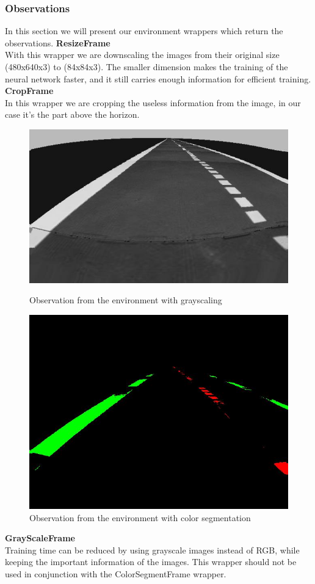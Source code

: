 \documentclass{article}
\begin{document}
\subsubsection{\normalsize{Observations}}
In this section we will present our environment wrappers which return the observations.
\textbullet  \textbf{ResizeFrame}\\
With this wrapper we are downscaling the images from their original size (480x640x3) \cite{kalap} to (84x84x3). The smaller dimension makes the training of the neural network faster, and it still carries enough information for efficient training.\\
\textbullet  \textbf{CropFrame}\\
In this wrapper we are cropping the useless information from the image, in our case it's the part above the horizon.\\
\begin{figure}[h!]
	\centering
	\begin{minipage}{.5\textwidth}
	\centering
	\includegraphics[width=0.8\linewidth]{grayscale.jpg}
	\caption{Observation from the environment with grayscaling}
	\end{minipage}%
\begin{minipage}{.5\textwidth}
	\centering
	\includegraphics[width=0.8\linewidth]{colorseg.jpg}
	\caption{Observation from the environment with color segmentation}
\end{minipage}
\end{figure}
\textbullet  \textbf{GrayScaleFrame}\\
Training time can be reduced by using grayscale images instead of RGB, while keeping the important information of the images. This wrapper should not be used in conjunction with the ColorSegmentFrame wrapper.\\
\end{document}
